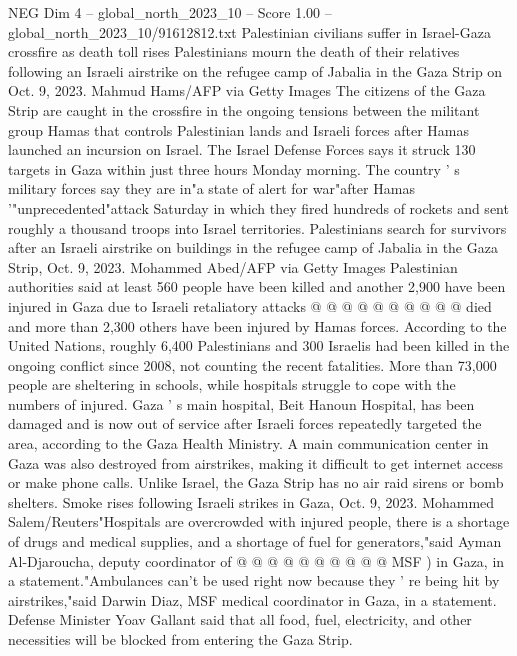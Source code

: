 \begin{textsample}{NEG Dim 4 – global\_north\_2023\_10 – Score 1.00 – global\_north\_2023\_10/91612812.txt}  \label{ex:f4_neg_002}
Palestinian civilians suffer in Israel-Gaza crossfire as death toll rises Palestinians mourn the death of their relatives following an Israeli airstrike on the refugee camp of Jabalia in the Gaza Strip on Oct. 9, 2023.
Mahmud Hams/AFP via Getty Images The citizens of the Gaza Strip are caught in the crossfire in the ongoing tensions between the militant group Hamas that controls Palestinian lands and Israeli forces after Hamas launched an incursion on Israel.
The Israel Defense Forces says it struck 130 targets in Gaza within just three hours Monday morning.
The country ' s military forces say they are in"a state of alert for war"after Hamas '"unprecedented"attack Saturday in which they fired hundreds of rockets and sent roughly a thousand troops into Israel territories.
Palestinians search for survivors after an Israeli airstrike on buildings in the refugee camp of Jabalia in the Gaza Strip, Oct. 9, 2023.
Mohammed Abed/AFP via Getty Images Palestinian authorities said at least 560 people have been killed and another 2,900 have been injured in Gaza due to Israeli retaliatory attacks @ @ @ @ @ @ @ @ @ @ died and more than 2,300 others have been injured by Hamas forces.
According to the United Nations, roughly 6,400 Palestinians and 300 Israelis had been killed in the ongoing conflict since 2008, not counting the recent fatalities.
More than 73,000 people are sheltering in schools, while hospitals struggle to cope with the numbers of injured.
Gaza ' s main hospital, Beit Hanoun Hospital, has been damaged and is now out of service after Israeli forces repeatedly targeted the area, according to the Gaza Health Ministry.
A main communication center in Gaza was also destroyed from airstrikes, making it difficult to get internet access or make phone calls.
Unlike Israel, the Gaza Strip has no air raid sirens or bomb shelters.
Smoke rises following Israeli strikes in Gaza, Oct. 9, 2023.
Mohammed Salem/Reuters"Hospitals are overcrowded with injured people, there is a shortage of drugs and medical supplies, and a shortage of fuel for generators,"said Ayman Al-Djaroucha, deputy coordinator of @ @ @ @ @ @ @ @ @ @ MSF ) in Gaza, in a statement."Ambulances can't be used right now because they ' re being hit by airstrikes,"said Darwin Diaz, MSF medical coordinator in Gaza, in a statement.
Defense Minister Yoav Gallant said that all food, fuel, electricity, and other necessities will be blocked from entering the Gaza Strip.

\end{textsample}
